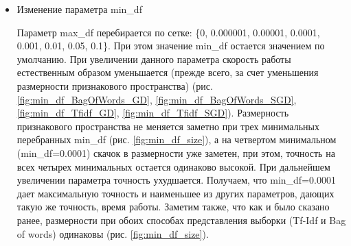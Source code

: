\documentclass{article}
\begin{document}
\begin{itemize}
  \item Изменение параметра min\_df

Параметр max\_df перебирается по сетке: \{0, 0.000001, 0.00001, 0.0001, 0.001, 0.01, 0.05, 0.1\}. При этом значение min\_df остается значением по умолчанию. При увеличении данного параметра скорость работы естественным образом уменьшается (прежде всего, за счет уменьшения размерности признакового пространства) (рис. \ref{fig:min_df_BagOfWords_GD}, \ref{fig:min_df_BagOfWords_SGD}, \ref{fig:min_df_Tfidf_GD}, \ref{fig:min_df_Tfidf_SGD}). Размерность признакового пространства не меняется заметно при трех минимальных перебранных min\_df (рис. \ref{fig:min_df_size}), а на четвертом минимальном (min\_df=0.0001) скачок в размерности уже заметен, при этом, точность на всех четырех минимальных остается одинаково высокой. При дальнейшем увеличении параметра точность ухудшается. Получаем, что min\_df=0.0001 дает максимальную точность и наименьшее из других параметров, дающих такую же точность, время работы. Заметим также, что как и было сказано ранее, размерности при обоих способах представления выборки (Tf-Idf и Bag of words) одинаковы (рис. \ref{fig:min_df_size}).



\end{itemize}
\end{document}
